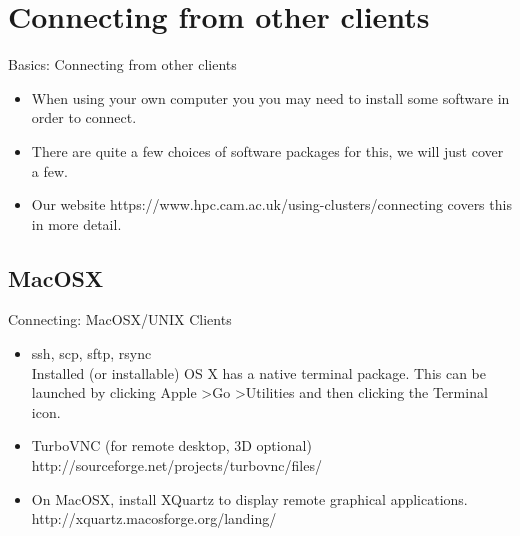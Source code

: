 \section{Connecting from other clients}
\begin{frame}{Basics: Connecting from other clients}
\begin{itemize}
\item{When using your own computer you you may need to install some software in order to connect.}
\pause
\item{There are quite a few choices of software packages for this, we will just cover a few.}
\pause
\item{Our website https://www.hpc.cam.ac.uk/using-clusters/connecting covers this in more detail.}
\end{itemize}
\end{frame}

\subsection{MacOSX}
\begin{frame}{Connecting: MacOSX/UNIX Clients}
\begin{itemize}
\item {\color<2->{red}ssh}, scp, sftp, {rsync}\hfill\\
\alert{\small Installed (or installable) OS X has a native terminal package. This can be launched by clicking Apple \textgreater Go \textgreater Utilities and then clicking the Terminal icon.}
\item<3-> TurboVNC \alert{\small (for remote desktop, 3D optional)}\hfill\\
\alert{\small http://sourceforge.net/projects/turbovnc/files/}
\item<4-> On MacOSX, install \alert{XQuartz} to display remote graphical applications.\hfill\\
\alert{\small http://xquartz.macosforge.org/landing/}
\end{itemize}
\end{frame}

